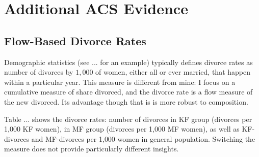\documentclass[12pt,letter]{article}
\begin{document}
%
%


\newpage
\appendix

\section{Additional ACS Evidence\label{app-additional-evidence}}
\subsection{Flow-Based Divorce Rates}
Demographic statistics (see ... for an example) typically defines divorce rates as number of divorces by $1{,}000$ of women, either all or ever married, that happen within a particular year. This measure is different from mine: I focus on a cumulative measure of share divorced, and the divorce rate is a flow measure of the new divorced. Its advantage though that is is more robust to composition. 

Table ... shows the divorce rates: number of divorces in KF group (divorces per 1{,}000 KF women), in MF group (divorces per 1{,}000 MF women), as well as KF-divorces and MF-divorces per 1{,}000 women in general population. Switching the measure does not provide particularly different insights.
\end{document}
